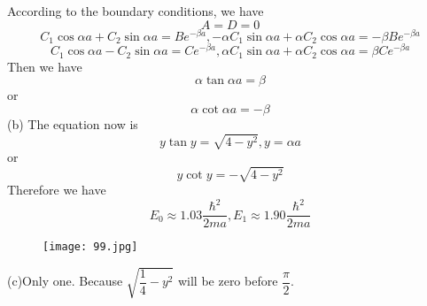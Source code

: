 \documentclass[utf8]{ctexart}
\begin{document}
According to the boundary conditions, we have
\[A=D=0\]
\[C_1\cos\alpha a+C_2\sin\alpha a=Be^{-\beta a},-\alpha C_1\sin\alpha a+\alpha C_2\cos\alpha a=-\beta Be^{-\beta a}\]
\[C_1\cos\alpha a-C_2\sin\alpha a=Ce^{-\beta a},\alpha C_1\sin\alpha a+\alpha C_2\cos\alpha a=\beta Ce^{-\beta a}\]
Then we have
\[\alpha\tan\alpha a=\beta\]
or
\[\alpha\cot\alpha a=-\beta\]
(b)
The equation now is
\[y\tan y=\sqrt{4-y^2},y=\alpha a\]
or
\[y\cot y=-\sqrt{4-y^2}\]
Therefore we have
\[E_0\approx1.03\frac{\hbar^2}{2ma},E_1\approx1.90\frac{\hbar^2}{2ma}\]
\begin{figure}[H]
	\centering
	\texttt{[image: 99.jpg]}
\end{figure}
(c)Only one. Because $\sqrt{\dfrac{1}{4}-y^2}$ will be zero before $\dfrac{\pi}{2}$.
\end{document}
